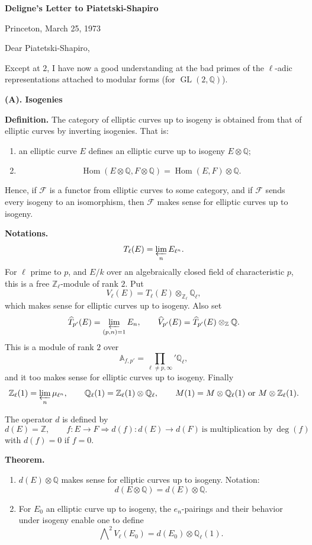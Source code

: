 \documentclass[11pt]{article}
\newcommand{\Q}{\mathbb{Q}}
\newcommand{\Z}{\mathbb{Z}}
\newcommand{\Ql}{\mathbb{Q}_{\ell}}
\newcommand{\Zl}{\mathbb{Z}_{\ell}}
\newcommand{\Afp}{\mathbb{A}_{f,p'}}
\newcommand{\Hom}{\operatorname{Hom}}
\newcommand{\GL}{\operatorname{GL}}
\newcommand{\Prolim}{\varprojlim}
\newcommand{\wh}{\widehat}
\begin{document}
\begin{center}
{\large\bfseries Deligne's Letter to Piatetski-Shapiro}
\end{center}

\begin{flushright}
Princeton, March 25, 1973
\end{flushright}

Dear Piatetski-Shapiro,

Except at \(2\), I have now a good understanding at the bad primes of the \(\ell\)-adic representations attached to modular forms (for \(\GL(2,\Q)\)).

\begin{center}
\textbf{(A). Isogenies}
\end{center}

\textbf{Definition.} The category of elliptic curves up to isogeny is obtained from that of elliptic curves by inverting isogenies. That is:
\begin{enumerate}[label=(\alph*)]
\item an elliptic curve \(E\) defines an elliptic curve up to isogeny \(E\otimes\Q\);
\item
\[
\Hom(E\otimes\Q,F\otimes\Q)=\Hom(E,F)\otimes\Q .
\]
\end{enumerate}
Hence, if \(\mathcal F\) is a functor from elliptic curves to some category, and if \(\mathcal F\) sends every isogeny to an isomorphism, then \(\mathcal F\) makes sense for elliptic curves up to isogeny.

\textbf{Notations.}
\[
T_{\ell}(E)=\Prolim_n E_{\ell^n}.
\]
For \(\ell\) prime to \(p\), and \(E/k\) over an algebraically closed field of characteristic \(p\), this is a free \(\Zl\)-module of rank \(2\). Put
\[
V_{\ell}(E)=T_{\ell}(E)\otimes_{\Zl}\Ql ,
\]
which makes sense for elliptic curves up to isogeny. Also set
\[
\wh{T}_{p'}(E)=\Prolim_{(p,n)=1}E_n,\qquad
\wh{V}_{p'}(E)=\wh{T}_{p'}(E)\otimes_{\Z}\Q .
\]
This is a module of rank \(2\) over
\[
\Afp=\prod_{\ell\neq p,\infty}'\Ql ,
\]
and it too makes sense for elliptic curves up to isogeny. Finally
\[
\Zl(1)=\Prolim_n\mu_{\ell^n},\qquad
\Ql(1)=\Zl(1)\otimes\Ql,\qquad
M(1)=M\otimes\Ql(1)\ \text{or}\ M\otimes\Zl(1).
\]

The operator \(d\) is defined by
\[
d(E)=\Z,\qquad
f:E\to F\Longrightarrow d(f):d(E)\to d(F)\ \text{is multiplication by}\ \deg(f)
\]
with \(d(f)=0\) if \(f=0\).

\textbf{Theorem.}
\begin{enumerate}[label=(\alph*)]
\item \(d(E)\otimes\Q\) makes sense for elliptic curves up to isogeny. Notation:
\[
d(E\otimes\Q)=d(E)\otimes\Q .
\]
\item For \(E_0\) an elliptic curve up to isogeny, the \(e_n\)-pairings and their behavior under isogeny enable one to define
\[
\bigwedge\nolimits^2 V_{\ell}(E_0)=d(E_0)\otimes\Ql(1).
\]
\end{enumerate}
\end{document}
